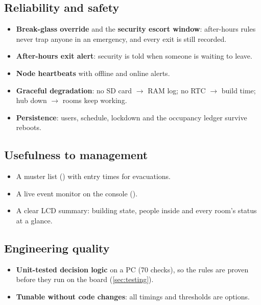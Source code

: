 \subsection{Reliability and safety}
\begin{itemize}
  \item \textbf{Break-glass override} and the \textbf{security escort window}: after-hours
        rules never trap anyone in an emergency, and every exit is still recorded.
  \item \textbf{After-hours exit alert}: security is told when someone is waiting to leave.
  \item \textbf{Node heartbeats} with offline and online alerts.
  \item \textbf{Graceful degradation}: no SD card $\rightarrow$ RAM log; no RTC $\rightarrow$ build
        time; hub down $\rightarrow$ rooms keep working.
  \item \textbf{Persistence}: users, schedule, lockdown and the occupancy ledger survive reboots.
\end{itemize}

\subsection{Usefulness to management}
\begin{itemize}
  \item A muster list () with entry times for evacuations.
  \item A live event monitor on the console ().
  \item A clear LCD summary: building state, people inside and every room's status at a glance.
\end{itemize}

\subsection{Engineering quality}
\begin{itemize}
  \item \textbf{Unit-tested decision logic} on a PC (70 checks), so the rules are proven before
        they run on the board (\cref{sec:testing}).
  \item \textbf{Tunable without code changes}: all timings and thresholds are 
        options.
\end{itemize}


